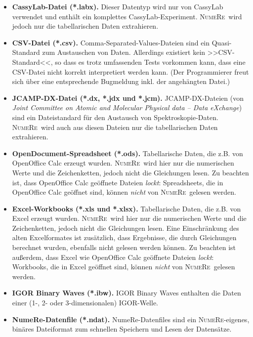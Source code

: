 \documentclass[DIV=14,headsepline,footsepline]{scrbook}
\newcommand{\NR}{\textsc{Nu\-me\-Re}}
\begin{document}
				\begin{itemize}
					\item \textbf{CassyLab-Datei (*.labx).} Dieser Datentyp wird nur von CassyLab verwendet und enthält ein komplettes CassyLab-Experiment. \NR\ wird jedoch nur die tabellarischen Daten extrahieren.
					\item \textbf{CSV-Datei (*.csv).} Comma-Separated-Values-Dateien sind ein Quasi-Standard zum Austauschen von Daten. Allerdings existiert kein >>CSV-Standard<<, so dass es trotz umfassenden Tests vorkommen kann, dass eine CSV-Datei nicht korrekt interpretiert werden kann. (Der Programmierer freut sich über eine entsprechende Bugmeldung inkl. der angehängten Datei.)
					\item \textbf{JCAMP-DX-Datei (*.dx, *.jdx und *.jcm).} JCAMP-DX-Dateien (von \emph{Joint Committee on Atomic and Molecular Physical data -- Data eXchange}) sind ein Dateistandard für den Austausch von Spek\-tro\-sko\-pie-Daten. \NR\ wird auch aus diesen Dateien nur die tabellarischen Daten extrahieren.
					\item \textbf{OpenDocument-Spreadsheet (*.ods).} Tabellarische Daten, die z.B. von OpenOffice Calc erzeugt wurden. \NR\ wird hier nur die numerischen Werte und die Zeichenketten, jedoch nicht die Gleichungen lesen. Zu beachten ist, dass OpenOffice Calc geöffnete Dateien \emph{lockt}: Spreadsheets, die in OpenOffice Calc geöffnet sind, können \emph{nicht} von \NR\ gelesen werden.
					\item \textbf{Excel-Workbooks (*.xls und *.xlsx).} Tabellarische Daten, die z.B. von Excel erzeugt wurden. \NR\ wird hier nur die numerischen Werte und die Zeichenketten, jedoch nicht die Gleichungen lesen. Eine Einschränkung des alten Excelformates ist zusätzlich, dass Ergebnisse, die durch Gleichungen berechnet wurden, ebenfalls nicht gelesen werden können. Zu beachten ist außerdem, dass Excel wie OpenOffice Calc geöffnete Dateien \emph{lockt}: Workbooks, die in Excel geöffnet sind, können \emph{nicht} von \NR\ gelesen werden.
					\item \textbf{IGOR Binary Waves (*.ibw).} IGOR Binary Waves enthalten die Daten einer (1-, 2- oder 3-dimensionalen) IGOR-Welle.
					\item \textbf{NumeRe-Datenfile (*.ndat).} NumeRe-Datenfiles sind ein \NR-eigenes, binäres Dateiformat zum schnellen Speichern und Lesen der Datensätze.
				\end{itemize}
				
\end{document}
